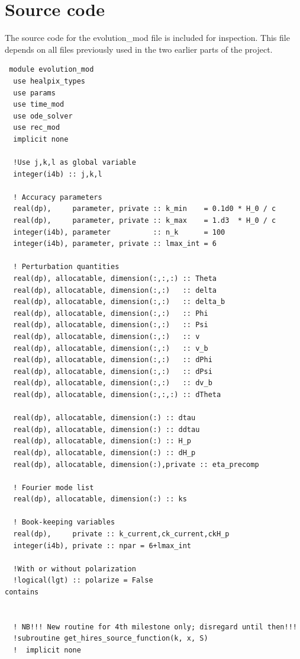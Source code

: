 \documentclass[a4paper]{report}
\begin{document}
\onecolumn 
\section{Source code}\label{sec:files}
The source code for the evolution\_mod file is included for inspection. This file depends on all files previously used in the two earlier parts of the project.

\begin{verbatim}
 module evolution_mod
  use healpix_types
  use params
  use time_mod
  use ode_solver
  use rec_mod
  implicit none

  !Use j,k,l as global variable
  integer(i4b) :: j,k,l

  ! Accuracy parameters
  real(dp),     parameter, private :: k_min    = 0.1d0 * H_0 / c
  real(dp),     parameter, private :: k_max    = 1.d3  * H_0 / c
  integer(i4b), parameter          :: n_k      = 100
  integer(i4b), parameter, private :: lmax_int = 6

  ! Perturbation quantities
  real(dp), allocatable, dimension(:,:,:) :: Theta
  real(dp), allocatable, dimension(:,:)   :: delta
  real(dp), allocatable, dimension(:,:)   :: delta_b
  real(dp), allocatable, dimension(:,:)   :: Phi
  real(dp), allocatable, dimension(:,:)   :: Psi
  real(dp), allocatable, dimension(:,:)   :: v
  real(dp), allocatable, dimension(:,:)   :: v_b
  real(dp), allocatable, dimension(:,:)   :: dPhi
  real(dp), allocatable, dimension(:,:)   :: dPsi
  real(dp), allocatable, dimension(:,:)   :: dv_b
  real(dp), allocatable, dimension(:,:,:) :: dTheta

  real(dp), allocatable, dimension(:) :: dtau
  real(dp), allocatable, dimension(:) :: ddtau
  real(dp), allocatable, dimension(:) :: H_p
  real(dp), allocatable, dimension(:) :: dH_p
  real(dp), allocatable, dimension(:),private :: eta_precomp

  ! Fourier mode list
  real(dp), allocatable, dimension(:) :: ks

  ! Book-keeping variables
  real(dp),     private :: k_current,ck_current,ckH_p
  integer(i4b), private :: npar = 6+lmax_int

  !With or without polarization
  !logical(lgt) :: polarize = False
contains


  ! NB!!! New routine for 4th milestone only; disregard until then!!!
  !subroutine get_hires_source_function(k, x, S)
  !  implicit none


\end{verbatim}
\end{document}
